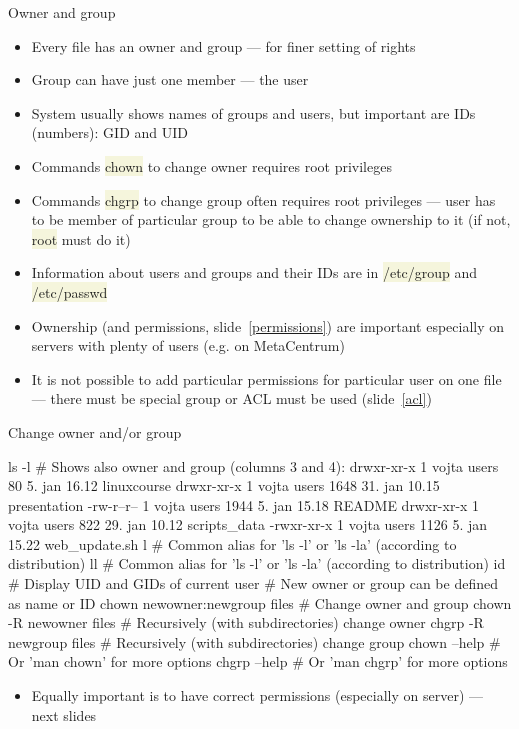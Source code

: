\documentclass[compress, ucs, xelatex, 11pt, xcolor=svgnames, aspectratio=169,
	hyperref={
		bookmarks=true,
		unicode=true,
		colorlinks=true,
		pdftitle={Linux, command line and MetaCentrum},
		plainpages=false,
		pdfauthor={Vojtech Zeisek},
		pdfsubject={Course about use of Linux command line, writing shell scripts and using MetaCentrum of CESNET},
		pdfcreator={XeLaTeX},
		pdfkeywords={Linux, GNU, BASH, shell, command line, MetaCentrum},
		linkcolor=DarkRed, %
		anchorcolor=DarkBlue, %
		citecolor=Indigo, %
		filecolor=NavyBlue, %
		menucolor=DarkMagenta, %
		urlcolor=DarkBlue, %
		pdftex},
	url={hyphens, lowtilde} %
	]{beamer}
\renewcommand{\texttt}[1]{\colorbox{Beige}{{\ttfamily #1}}}
\begin{document}
\begin{frame}{Owner and group}
	\begin{itemize}
		\item Every file has an owner and group --- for finer setting of rights
		\item Group can have just one member --- the user
		\item System usually shows names of groups and users, but important are IDs (numbers): GID and UID
		\item Commands \texttt{chown} to change owner requires root privileges
		\item Commands \texttt{chgrp} to change group often requires root privileges --- user has to be member of particular group to be able to change ownership to it (if not, \texttt{root} must do it)
		\item Information about users and groups and their IDs are in \texttt{/etc/group} and \texttt{/etc/passwd}
		\item Ownership (and permissions, slide~\ref{permissions}) are important especially on servers with plenty of users (e.g. on MetaCentrum)
		\item It is not possible to add particular permissions for particular user on one file --- there must be special group or ACL must be used (slide~\ref{acl})
	\end{itemize}
\end{frame}

\begin{frame}[fragile]{Change owner and/or group}
	\begin{bashcode}
    ls -l # Shows also owner and group (columns 3 and 4):
    drwxr-xr-x 1 vojta users    80  5. jan 16.12 linuxcourse
    drwxr-xr-x 1 vojta users  1648 31. jan 10.15 presentation
    -rw-r--r-- 1 vojta users  1944  5. jan 15.18 README
    drwxr-xr-x 1 vojta users   822 29. jan 10.12 scripts_data
    -rwxr-xr-x 1 vojta users  1126  5. jan 15.22 web_update.sh
    l # Common alias for 'ls -l' or 'ls -la' (according to distribution)
    ll # Common alias for 'ls -l' or 'ls -la' (according to distribution)
    id # Display UID and GIDs of current user
    # New owner or group can be defined as name or ID
    chown newowner:newgroup files # Change owner and group
    chown -R newowner files # Recursively (with subdirectories) change owner
    chgrp -R newgroup files # Recursively (with subdirectories) change group
    chown --help # Or 'man chown' for more options
    chgrp --help # Or 'man chgrp' for more options
	\end{bashcode}
	\begin{itemize}
		\item Equally important is to have correct permissions (especially on server) --- next slides
	\end{itemize}
\end{frame}
\end{document}
